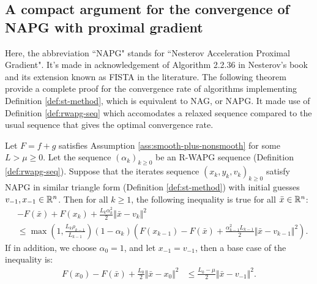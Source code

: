 \documentclass[12pt]{article}
\begin{document}
    \subsection{A compact argument for the convergence of NAPG with proximal gradient}
        Here, the abbreviation ``NAPG" stands for ``Nesterov Acceleration Proximal Gradient". 
        It's made in acknowledgement of Algorithm 2.2.36 in Nesterov's book \cite{nesterov_lectures_2018} and its extension known as FISTA in the literature.
        The following theorem provide a complete proof for the convergence rate of algorithms implementing Definition \ref{def:st-method}, which is equivalent to NAG, or NAPG. 
        It made use of Definition \ref{def:rwapg-seq} which accomodates a relaxed sequence compared to the usual sequence that gives the optimal convergence rate. 
        \begin{theorem}\label{thm:onestep-napg-cnvg}
            Let $F = f + g$ satisfies Assumption \ref{ass:smooth-plus-nonsmooth} for some $L > \mu \ge 0$. 
            Let the sequence $(\alpha_k)_{k \ge0}$ be an R-WAPG sequence (Definition \ref{def:rwapg-seq}). 
            Suppose that the iterates sequence $(x_k, y_k, v_k)_{k \ge 0}$ satisfy NAPG in similar triangle form (Definition \ref{def:st-method}) with initial guesses $v_{-1}, x_{-1} \in \mathbb R^n$. 
            Then for all $k \ge 1$, the following inequality is true for all $\bar x \in \mathbb R^n$: 
            \begin{align*}
                & - F(\bar x) + F(x_k) + \frac{L_k\alpha_k^2}{2}\Vert \bar x - v_k\Vert^2 
                \\
                & \le \max\left(1, \frac{L_k\rho_{k - 1}}{L_{k - 1}}\right)(1 - \alpha_k)\left(
                    F(x_{k - 1}) - F(\bar x) 
                    + \frac{\alpha_{k - 1}^2L_{k - 1}}{2}\Vert \bar x - v_{k - 1}\Vert^2
                \right). 
            \end{align*}
            If in addition, we choose $\alpha_0 = 1$, and let $x_{-1} = v_{-1}$, then a base case of the inequality is: 
            \begin{align*}
                F(x_{0}) - F(\bar x) + \frac{L_0}{2}\Vert \bar x - x_{0}\Vert^2 
                &\le \frac{L_0 - \mu}{2}\Vert \bar x - v_{-1}\Vert^2. 
            \end{align*}
        \end{theorem}
\end{document}
